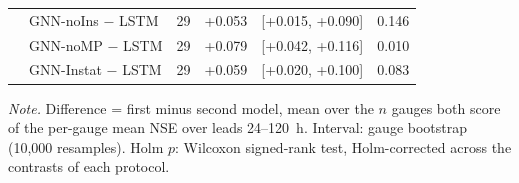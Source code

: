 \begin{table}
\begin{tabular}{@{}llrrrr@{}}
 & GNN-noIns $-$ LSTM & 29 & +0.053 & [+0.015, +0.090] & 0.146 \\
 & GNN-noMP $-$ LSTM & 29 & +0.079 & [+0.042, +0.116] & 0.010 \\
 & GNN-Instat $-$ LSTM & 29 & +0.059 & [+0.020, +0.100] & 0.083 \\
\bottomrule
\end{tabular}
\begin{flushleft}
\footnotesize \emph{Note.} Difference = first minus second model, mean over the $n$ gauges both score of the per-gauge mean NSE over leads 24--120~h. Interval: gauge bootstrap (10,000 resamples). Holm $p$: Wilcoxon signed-rank test, Holm-corrected across the contrasts of each protocol.
\end{flushleft}
\end{table}
